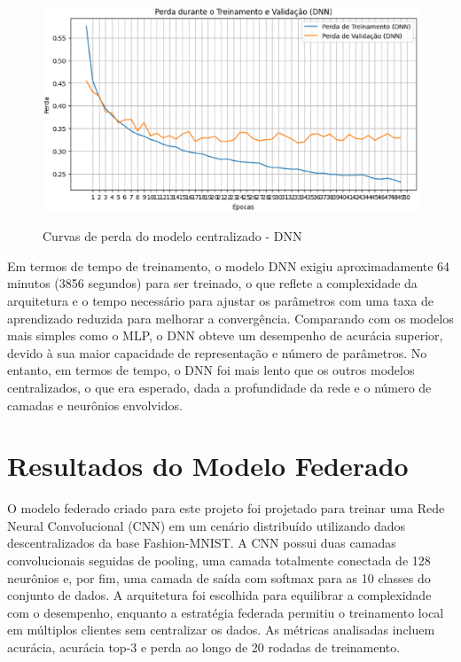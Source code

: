 \begin{figure}[ht]
    \centering
    \caption{Curvas de perda do modelo centralizado - DNN}
    \includegraphics[scale=0.4]{figuras/analiseResultados/lossDNN.eps}
    \label{fig:lossDNN}
\end{figure}

Em termos de tempo de treinamento, o modelo DNN exigiu aproximadamente 64 minutos (3856 segundos) para ser treinado, o que reflete a complexidade da arquitetura e o tempo necessário para ajustar os parâmetros com uma taxa de aprendizado reduzida para melhorar a convergência. Comparando com os modelos mais simples como o MLP, o DNN obteve um desempenho de acurácia superior, devido à sua maior capacidade de representação e número de parâmetros. No entanto, em termos de tempo, o DNN foi mais lento que os outros modelos centralizados, o que era esperado, dada a profundidade da rede e o número de camadas e neurônios envolvidos.

\section{Resultados do Modelo Federado}

O modelo federado criado para este projeto foi projetado para treinar uma Rede Neural Convolucional (CNN) em um cenário distribuído utilizando dados descentralizados da base Fashion-MNIST. A CNN possui duas camadas convolucionais seguidas de pooling, uma camada totalmente conectada de 128 neurônios e, por fim, uma camada de saída com softmax para as 10 classes do conjunto de dados. A arquitetura foi escolhida para equilibrar a complexidade com o desempenho, enquanto a estratégia federada permitiu o treinamento local em múltiplos clientes sem centralizar os dados. As métricas analisadas incluem acurácia, acurácia top-3 e perda ao longo de 20 rodadas de treinamento.

